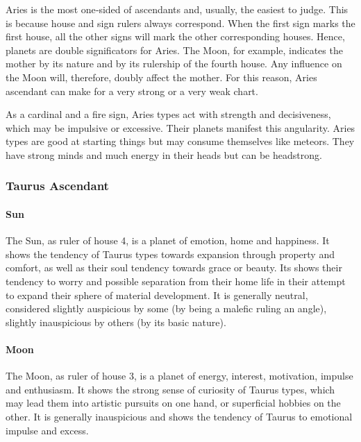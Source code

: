  

Aries is the most one‑sided of ascendants and, usually, the easiest to judge. This is because house and sign rulers always correspond. When the first sign marks the first house, all the other signs will mark the other corresponding houses. Hence, planets are double significators for Aries. The Moon, for example, indicates the mother by its nature and by its rulership of the fourth house. Any influence on the Moon will, therefore, doubly affect the mother. For this reason, Aries ascendant can make for a very strong or a very weak chart.

 

As a cardinal and a fire sign, Aries types act with strength and decisiveness, which may be impulsive or excessive. Their planets manifest this angularity. Aries types are good at starting things but may consume themselves like meteors. They have strong minds and much energy in their heads but can be headstrong.

 

\subsubsection{Taurus Ascendant}
 

\paragraph{Sun}

The Sun, as ruler of house 4, is a planet of emotion, home and happiness. It shows the tendency of Taurus types towards expansion through property and comfort, as well as their soul tendency towards grace or beauty. Its shows their tendency to worry and possible separation from their home life in their attempt to expand their sphere of material development. It is generally neutral, considered slightly auspicious by some (by being a malefic ruling an angle), slightly inauspicious by others (by its basic nature).

 

\paragraph{Moon}

The Moon, as ruler of house 3, is a planet of energy, interest, motivation, impulse and enthusiasm. It shows the strong sense of curiosity of Taurus types, which may lead them into artistic pursuits on one hand, or superficial hobbies on the other. It is generally inauspicious and shows the tendency of Taurus to emotional impulse and excess.

